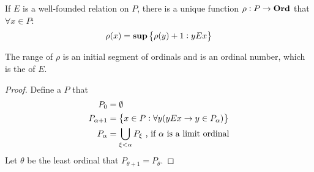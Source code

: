 \begin{theorem}
    If $E$ is a well-founded relation on $P$, there is a unique function $\rho : P \rightarrow \mathbf{Ord}$ that $\forall x \in P$:
    \begin{equation}
        \rho(x) = \mathbf{sup} \set{\rho (y) + 1: y E x}
    \end{equation}
    
    The range of $\rho$ is an initial segment of ordinals and is an ordinal number, which is the  of $E$.
\end{theorem}
\begin{proof}
    Define a $P$ that
    \begin{equation}
        \begin{aligned}
            P_0 &= \emptyset \\
            P_{\alpha + 1} &= \set{x \in P: \forall y (y E x \rightarrow y \in P_\alpha )} \\
            P_\alpha &= \bigcup_{\xi < \alpha} P_\xi \text{ , if } \alpha \text{ is a limit ordinal}
        \end{aligned}
    \end{equation}
    Let $\theta$ be the least ordinal that $P_{\theta +1} = P_\theta$.
\end{proof}







































